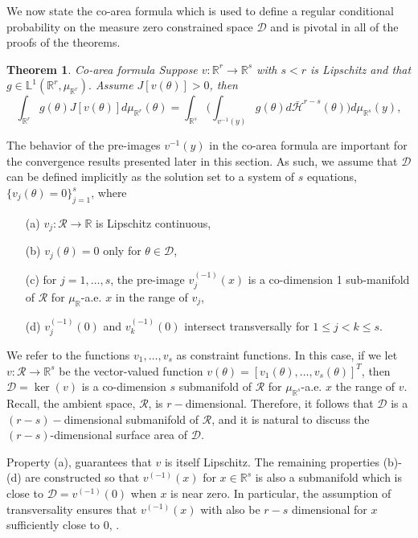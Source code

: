 \documentclass[10pt,fleqn]{article}
\newcommand{\leo}[1]{{\color{blue}{#1}}}
\newtheorem{theorem}{Theorem} \newtheorem{lemma}{Lemma}
\DeclareMathOperator{\1}{\mathbbm{1}} \DeclareMathOperator{\bigO}{\mc O}
\begin{document}
We now state the co-area formula which is used to define a regular
conditional probability on the measure zero constrained space $\mathcal{D}$
and is pivotal in all of the proofs of the theorems.
\begin{theorem}{Co-area formula \citep{diaconis2013manifold,
federer2014geometric}} Suppose $v:\mathbb{R}^r\to\mathbb{R}^s$
with $ s<r$ is Lipschitz and that
$g\in\mathbb{L}^1(\mathbb{R}^r,\mu_{\mathbb{R}^r}).$ Assume
$J[v(\theta)]>0$, then \begin{equation} \int_{\mathbb{R}^r}
g(\theta)J[v(\theta)]d\mu_{\mathbb{R}^r}( \theta)=
\int_{\mathbb{R}^s} \bigg( \int_{v^{-1}(y)}g(\theta)
d\bar{\mathcal{H}}^{r-s}(\theta)\bigg)d\mu_{\mathbb{R}^s}(y),
\end{equation} \end{theorem} The behavior of the pre-images
$v^{-1}(y)$ in the co-area formula are important for the
convergence results presented later in this section.  As such, we assume that $\mathcal{D}$ can be defined implicitly as the
solution set to a system of $s$ equations,  $\{v_j(\theta)=0\}_{j=1}^s$,
where \begin{itemize} \item[(a)] $v_j:\mathcal{R}\to\mathbb{R}$ is
Lipschitz continuous, \item[(b)] $v_j(\theta)=0$ only for
$\theta\in\mathcal{D}$, \item[(c)] for $j=1,\dots, s$, the
pre-image
$v_j^{(-1)}(x)$ is a co-dimension 1 sub-manifold of $\mathcal{R}$
for $\mu_\mathbb{R}$-a.e. $x$ in the range of $v_j$, \item[(d)]
$v_j^{(-1)}(0)$ and $v_k^{(-1)}(0)$ intersect transversally for
$1\le j<k\le s.$ \end{itemize}

We refer to the functions
$v_1,\dots,v_s$ as constraint functions. In this case, if we
let $v:\mathcal{R}\to \mathbb{R}^s$ be the vector-valued function
$v(\theta) = [v_1(\theta),\dots,v_s(\theta)]^T$, then
$\mathcal{D} = \ker(v)$ is a co-dimension $s$ submanifold of
$\mathcal{R}$ for $\mu_{\mathbb{R}^s}$-a.e. $x$ the range of $v.$
Recall, the ambient space, $\mathcal{R}$, is $r-$dimensional.
Therefore, it follows that $\mathcal{D}$ is a $(r-s)-$dimensional
submanifold of $\mathcal{R}$, and it is natural to discuss the
$(r-s)$-dimensional surface area of $\mathcal{D}.$

Property (a), guarantees that $v$ is itself Lipschitz.  The remaining
properties (b)-(d) are constructed so that $v^{(-1)}(x)$ for
$x\in\mathbb{R}^s$ is also a submanifold which is close to
$\mathcal{D}=v^{(-1)}(0)$ when $x$ is near zero.  In particular, the
assumption of transversality ensures that $v^{(-1)}(x)$ with also be
$r-s$ dimensional for $x$ sufficiently close to 0, \leo{defined by the
set $\mc X$}.
\end{document}
